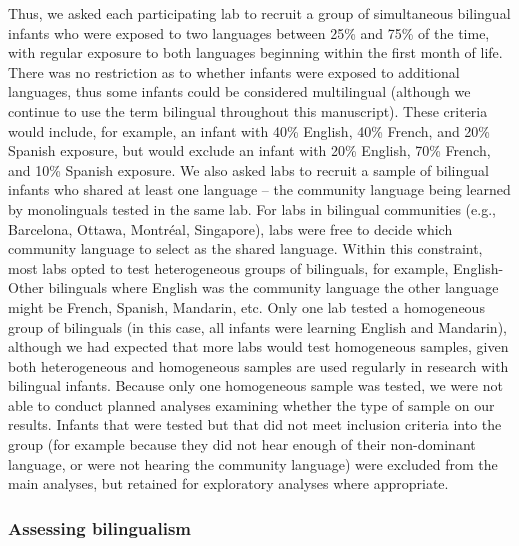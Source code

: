 \documentclass[,man,floatsintext]{apa6}
\begin{document}
Thus, we asked each participating lab to recruit a group of simultaneous bilingual infants who were exposed to two languages between 25\% and 75\% of the time, with regular exposure to both languages beginning within the first month of life. There was no restriction as to whether infants were exposed to additional languages, thus some infants could be considered multilingual (although we continue to use the term bilingual throughout this manuscript). These criteria would include, for example, an infant with 40\% English, 40\% French, and 20\% Spanish exposure, but would exclude an infant with 20\% English, 70\% French, and 10\% Spanish exposure. We also asked labs to recruit a sample of bilingual infants who shared at least one language -- the community language being learned by monolinguals tested in the same lab. For labs in bilingual communities (e.g., Barcelona, Ottawa, Montréal, Singapore), labs were free to decide which community language to select as the shared language. Within this constraint, most labs opted to test heterogeneous groups of bilinguals, for example, English-Other bilinguals where English was the community language the other language might be French, Spanish, Mandarin, etc. Only one lab tested a homogeneous group of bilinguals (in this case, all infants were learning English and Mandarin), although we had expected that more labs would test homogeneous samples, given both heterogeneous and homogeneous samples are used regularly in research with bilingual infants. Because only one homogeneous sample was tested, we were not able to conduct planned analyses examining whether the type of sample on our results. Infants that were tested but that did not meet inclusion criteria into the group (for example because they did not hear enough of their non-dominant language, or were not hearing the community language) were excluded from the main analyses, but retained for exploratory analyses where appropriate.

\hypertarget{assessing-bilingualism}{%
\subsubsection{Assessing bilingualism}\label{assessing-bilingualism}}
\end{document}
